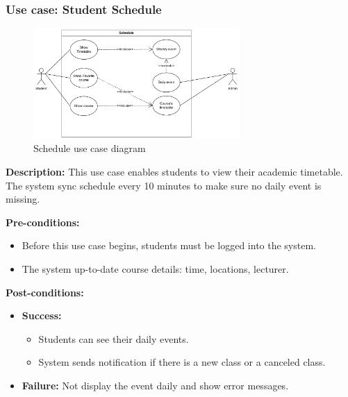 \documentclass[12pt]{article}
\begin{document}
    

\subsubsection{Use case: Student Schedule}
    \begin{figure}[H]
        \centering
        \includegraphics[width=0.7\textwidth]{image/StudentScheduleUseCase.pdf} 
        \caption{Schedule use case diagram}
        \label{fig:schedule_use_case}
    \end{figure}
    \textbf{Description:} This use case enables students to view their academic timetable. The system sync schedule every 10 minutes to make sure no daily event is missing. \\

    \pagebreak

    \noindent \textbf{Pre-conditions:} 
        \begin{itemize}
            \item Before this use case begins, students must be logged into the system.
            \item The system up-to-date course details: time, locations, lecturer.
        \end{itemize}

    \noindent \textbf{Post-conditions:}
    \begin{itemize}
        \item \textbf{Success:} 
        \begin{itemize}
            \item Students can see their daily events.
            \item System sends notification if there is a new class or a canceled class.
        \end{itemize}
        \item \textbf{Failure:} Not display the event daily and show error messages.
    \end{itemize}
\end{document}
